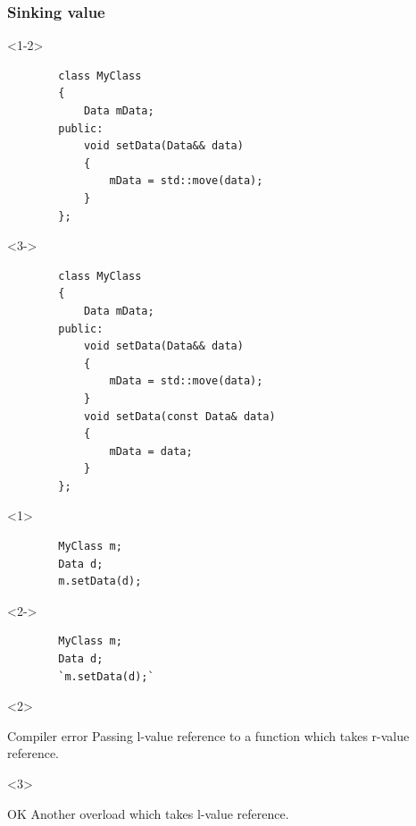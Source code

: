 \documentclass{beamer}
\begin{document}
\begin{frame}[fragile,t]
\frametitle{Sinking value}
    \begin{onlyenv}<1-2>
    \begin{lstlisting}
        class MyClass
        {
            Data mData;
        public:		
            void setData(Data&& data)
            {
                mData = std::move(data);
            }
        };
    \end{lstlisting}
    \end{onlyenv}

    \begin{onlyenv}<3->
    \begin{lstlisting}
        class MyClass
        {
            Data mData;
        public:		
            void setData(Data&& data)
            {
                mData = std::move(data);
            }
            void setData(const Data& data)
            {
                mData = data;
            }
        };
    \end{lstlisting}
    \end{onlyenv}

    \hrulefill
    \begin{onlyenv}<1>
    \begin{lstlisting}
        MyClass m;
        Data d;
        m.setData(d);
    \end{lstlisting}
    \end{onlyenv}

    \begin{onlyenv}<2->
    \begin{lstlisting}
        MyClass m;
        Data d;
        `m.setData(d);`
    \end{lstlisting}
    \end{onlyenv}

    \begin{onlyenv}<2>
    \begin{alertblock}{Compiler error}
        Passing l-value reference to a function which takes r-value reference.       
    \end{alertblock}
    \end{onlyenv}

    \begin{onlyenv}<3>
    \begin{block}{OK}
        Another overload which takes l-value reference.
    \end{block}
    \end{onlyenv}
\end{frame}
\end{document}
